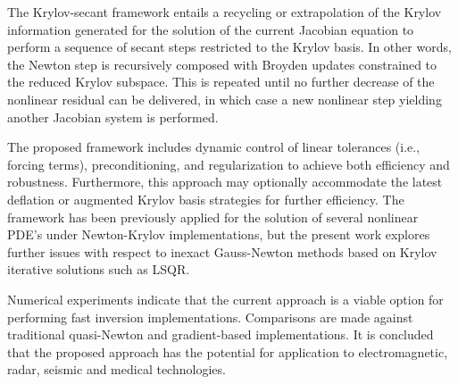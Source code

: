 \documentclass{report}
\begin{document}
The Krylov-secant framework entails a recycling or extrapolation
of the Krylov information generated for the solution of the
current Jacobian equation to perform a sequence of secant steps
restricted to the Krylov basis. In other words, the Newton step is
recursively composed with Broyden updates constrained to the
reduced Krylov subspace. This is repeated until no further
decrease of the nonlinear residual can be delivered, in which case
a new nonlinear step yielding another Jacobian system is
performed.

The proposed framework includes dynamic control of linear
tolerances (i.e., forcing terms), preconditioning, and
regularization to achieve both efficiency and robustness.
Furthermore, this approach may optionally accommodate the latest
deflation or augmented Krylov basis strategies for further
efficiency. The framework has been previously applied for the
solution of several nonlinear PDE's under Newton-Krylov
implementations, but the present work explores further issues with
respect to inexact Gauss-Newton methods based on Krylov iterative
solutions such as LSQR.

Numerical experiments indicate that the current approach is a
viable option for performing fast inversion implementations.
Comparisons are made against traditional quasi-Newton and
gradient-based implementations. It is concluded that the proposed
approach has the potential for application to electromagnetic,
radar, seismic and medical technologies.
\end{document}

